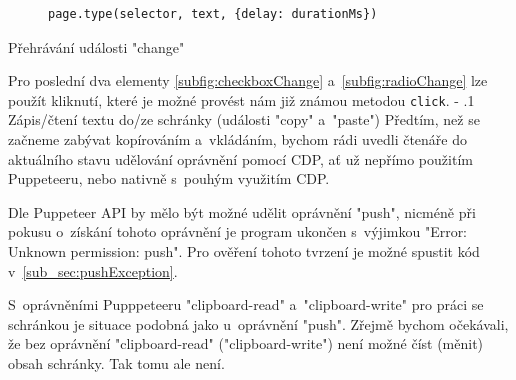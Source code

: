 \documentclass[12pt, a4paper, twoside]{article}
\makeatletter
\renewcommand\paragraph{%
	\@startsection{subparagraph}{5}{0mm}%
	{-\baselineskip}%
	{.1\baselineskip}%
	{\normalfont\normalsize\bfseries}}
\makeatother
\begin{document}
	\begin{codefigure}[H] \ContinuedFloat
		\begin{subfigure}[t]{\textwidth}
			\begin{lstlisting}[style=MyJavaScript]
page.type(selector, text, {delay: durationMs})
			\end{lstlisting}
			\caption{}
		\end{subfigure}
	\caption{Přehrávání události "change"}
	\end{codefigure}
	Pro poslední dva elementy \cref{subfig:checkboxChange} a~\ref{subfig:radioChange} lze použít kliknutí, které je možné provést nám již známou metodou \texttt{click}. 
	\paragraph{Zápis/čtení textu do/ze schránky (události "copy" a~"paste")}
	Předtím, než se začneme zabývat kopírováním a~vkládáním, bychom rádi uvedli čtenáře do aktuálního stavu udělování oprávnění pomocí CDP, ať už nepřímo použitím Puppeteeru, nebo nativně s~pouhým využitím CDP.
	
	Dle Puppeteer API by mělo být možné udělit oprávnění "push", nicméně při pokusu o~získání tohoto oprávnění je program ukončen s~výjimkou "Error: Unknown permission: push". Pro ověření tohoto tvrzení je možné spustit kód v~\ref{sub_sec:pushException}.
	
	S~oprávněními Pupppeteeru "clipboard-read" a~"clipboard-write" pro práci se schránkou je situace podobná jako u~oprávnění "push". Zřejmě bychom očekávali, že bez oprávnění "clipboard-read" ("clipboard-write") není možné číst (měnit) obsah schránky. Tak tomu ale není.
	
\end{document}
